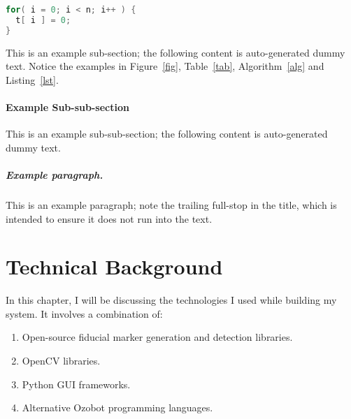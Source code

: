 \documentclass[oneside,%
                    author={Malak Hajji},
                    degree={BSc},
                    title={Designing An Accessible Computational Toolkit For Students},
                  subtitle={With Mixed Visual Abilities}]{dissertation}
\begin{document}
\begin{lstlisting}[float={t},caption={This is an example listing.},label={lst},language=C]
for( i = 0; i < n; i++ ) {
  t[ i ] = 0;
}
\end{lstlisting}

This is an example sub-section;
the following content is auto-generated dummy text.
Notice the examples in Figure~\ref{fig}, Table~\ref{tab}, Algorithm~\ref{alg}
and Listing~\ref{lst}.
\lipsum

\subsubsection{Example Sub-sub-section}

This is an example sub-sub-section;
the following content is auto-generated dummy text.
\lipsum

\paragraph{Example paragraph.}

This is an example paragraph; note the trailing full-stop in the title,
which is intended to ensure it does not run into the text.


\chapter{Technical Background}
\label{chap:evaluation}



\noindent
In this chapter, I will be discussing the technologies I used while building my system. It involves a combination of:

\begin{enumerate}
\item Open-source fiducial marker generation and detection libraries.
\item OpenCV libraries.
\item Python GUI frameworks. 
\item Alternative Ozobot programming languages.
\end{enumerate}
\end{document}
